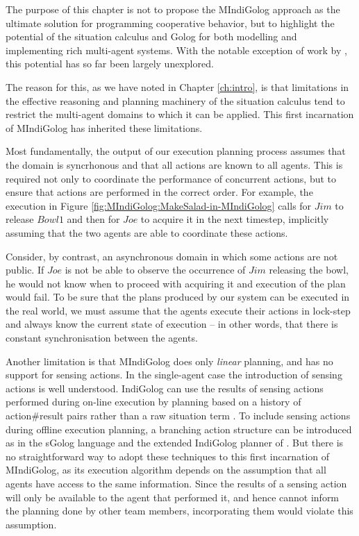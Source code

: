 The purpose of this chapter is not to propose the MIndiGolog approach
as the ultimate solution for programming cooperative behavior, but
to highlight the potential of the situation calculus and Golog for
both modelling and implementing rich multi-agent systems. With the
notable exception of work by \citep{Ferrein2005readylog,farinelli07team_golog},
this potential has so far been largely unexplored.

The reason for this, as we have noted in Chapter \ref{ch:intro},
is that limitations in the effective reasoning and planning machinery of
the situation calculus tend to restrict the multi-agent domains to
which it can be applied. This first incarnation of MIndiGolog has inherited
these limitations.

Most fundamentally, the output of our execution planning process assumes
that the domain is syncrhonous and that all actions are known to all
agents. This is required not only to coordinate the performance of
concurrent actions, but to ensure that actions are performed in the
correct order. For example, the execution in Figure \ref{fig:MIndiGolog:MakeSalad-in-MIndiGolog}
calls for $Jim$ to release $Bowl1$ and then for $Joe$ to acquire
it in the next timestep, implicitly assuming that the two agents are
able to coordinate these actions.

Consider, by contrast, an asynchronous domain in which some actions
are not public. If $Joe$ is not be able to observe the occurrence
of $Jim$ releasing the bowl, he would not know when to proceed with
acquiring it and execution of the plan would fail. To be sure that
the plans produced by our system can be executed in the real world,
we must assume that the agents execute their actions in lock-step
and always know the current state of execution -- in other words,
that there is constant synchronisation between the agents.

Another limitation is that MIndiGolog does only \emph{linear} planning,
and has no support for sensing actions. In the single-agent case the
introduction of sensing actions is well understood. IndiGolog can
use the results of sensing actions performed during on-line execution
by planning based on a history of action\#result pairs rather than
a raw situation term \citep{giacomo99indigolog}. To include sensing
actions during offline execution planning, a branching action structure
can be introduced as in the sGolog language \citep{lakemeyer99golog_cats}
and the extended IndiGolog planner of \citep{giacomo04sem_delib_indigolog}.
But there is no straightforward way to adopt these techniques to this
first incarnation of MIndiGolog, as its execution algorithm depends
on the assumption that all agents have access to the same information.
Since the results of a sensing action will only be available to the
agent that performed it, and hence cannot inform the planning done
by other team members, incorporating them would violate this assumption.

